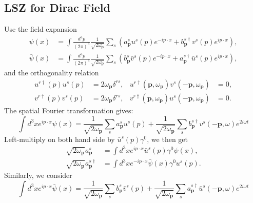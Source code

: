 \subsection{LSZ for Dirac Field}
Use the field expansion
\begin{equation*}
\begin{aligned}
	\psi(x) &=\int \frac{d^{3} p}{(2 \pi)^{3}} \frac{1}{\sqrt{2 \omega_{\mathbf{p}}}} 
		\sum_{s}\left(a_{\mathbf{p}}^{s} u^{s}(p) e^{-i p \cdot x}
		+b_{\mathbf{p}}^{s \dagger} v^{s}(p) e^{i p \cdot x}\right), \\
	\bar{\psi}(x) &=\int \frac{d^{3} p}{(2 \pi)^{3}} \frac{1}{\sqrt{2 \omega_{\mathbf{p}}}} 
		\sum_{s}\left(b_{\mathbf{p}}^{s} \bar{v}^{s}(p) e^{-i p \cdot x}
		+a_{\mathbf{p}}^{s \dagger} \bar{u}^{s}(p) e^{i p \cdot x}\right),
\end{aligned}
\end{equation*}
and the orthogonality relation
\begin{equation*}
\begin{aligned}
	u^{r \dagger}(p) u^{s}(p) &= 2 \omega_{\bm p} \delta^{r s}, & 
	u^{r \dagger}(\bm p,\omega_{\bm p}) v^{s}(-\bm p,\omega_{\bm p}) &= 0,\\
	v^{r \dagger}(p) v^{s}(p) &= 2\omega_{\bm p} \delta^{r s}, & 
	v^{r \dagger}(\bm p,\omega_{\bm p}) u^{s}(-\bm p,\omega_{\bm p}) &= 0.
\end{aligned}
\end{equation*}
The spatial Fourier transformation gives:
\begin{equation*}
	\int d^3x e^{ip\cdot x}\psi(x) = \frac{1}{\sqrt{2\omega_{\bm p}}}\sum_s a^s_{\bm p}u^s(p) +\frac{1}{\sqrt{2\omega_{\bm p}}}\sum_s b^{s \dagger}_{\bm p} v^s(-\bm p,\omega) e^{2i\omega t}
\end{equation*}
Left-multiply on both hand side by $\bar u^{s}(p) \gamma^0$, we then get
\begin{equation*}
\begin{aligned}
	\sqrt{2\omega_{\bm p}}a^{s}_{\bm p} &= \int d^3 x e^{ip\cdot x}\bar u^{s}(p)\gamma^0 \psi(x), \\
	\sqrt{2\omega_{\bm p}}a^{s \dagger}_{\bm p} &= \int d^3 x e^{-ip\cdot x}\bar\psi(x)\gamma^0 u^{s}(p).
\end{aligned}
\end{equation*}
Similarly, we consider
\begin{equation*}
	\int d^3x e^{ip\cdot x}\bar\psi(x) = \frac{1}{\sqrt{2\omega_{\bm p}}}\sum_s b^s_{\bm p}\bar v^s(p) +\frac{1}{\sqrt{2\omega_{\bm p}}}\sum_s a^{s \dagger}_{\bm p} \bar u^s(-\bm p,\omega) e^{2i\omega t}
\end{equation*}
